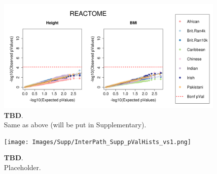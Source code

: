 \documentclass[12pt, a4paper]{article}
\begin{document}
\begin{figure}[htbp]
\centering
\includegraphics[scale=.35]{Images/Supp/InterPath_Supp_Figure_perm1_QQPlots_REACTOME_vs1.png}
\caption[TBD]{\textbf{TBD}. \\ Same as above (will be put in Supplementary).}
\label{InterPath-Supp-Figure-perm1-QQPlots-REACTOME}
\end{figure}

\begin{figure}[htbp]
\centering
\texttt{[image: Images/Supp/InterPath\_Supp\_pValHists\_vs1.png]}
\caption[TBD]{\textbf{TBD}. \\ Placeholder.}
\label{InterPath-Supp-Figure-perms-pValHists}
\end{figure}
\end{document}
